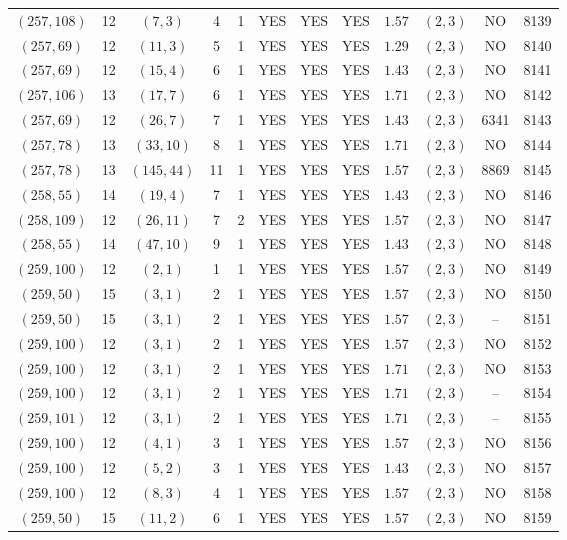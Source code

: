 \begin{longtable}{|c|c|c|c|c|c|c|c|c|c|c|c|}
$(257,108)$ & 12 & $(7,3)$ & 4 & 1 & YES & YES & YES & $1.57$ & $(2,3)$ & NO & 8139\\
$(257,69)$ & 12 & $(11,3)$ & 5 & 1 & YES & YES & YES & $1.29$ & $(2,3)$ & NO & 8140\\
$(257,69)$ & 12 & $(15,4)$ & 6 & 1 & YES & YES & YES & $1.43$ & $(2,3)$ & NO & 8141\\
$(257,106)$ & 13 & $(17,7)$ & 6 & 1 & YES & YES & YES & $1.71$ & $(2,3)$ & NO & 8142\\
$(257,69)$ & 12 & $(26,7)$ & 7 & 1 & YES & YES & YES & $1.43$ & $(2,3)$ & 6341 & 8143\\
$(257,78)$ & 13 & $(33,10)$ & 8 & 1 & YES & YES & YES & $1.71$ & $(2,3)$ & NO & 8144\\
$(257,78)$ & 13 & $(145,44)$ & 11 & 1 & YES & YES & YES & $1.57$ & $(2,3)$ & 8869 & 8145\\
$(258,55)$ & 14 & $(19,4)$ & 7 & 1 & YES & YES & YES & $1.43$ & $(2,3)$ & NO & 8146\\
$(258,109)$ & 12 & $(26,11)$ & 7 & 2 & YES & YES & YES & $1.57$ & $(2,3)$ & NO & 8147\\
$(258,55)$ & 14 & $(47,10)$ & 9 & 1 & YES & YES & YES & $1.43$ & $(2,3)$ & NO & 8148\\
$(259,100)$ & 12 & $(2,1)$ & 1 & 1 & YES & YES & YES & $1.57$ & $(2,3)$ & NO & 8149\\
$(259,50)$ & 15 & $(3,1)$ & 2 & 1 & YES & YES & YES & $1.57$ & $(2,3)$ & NO & 8150\\
$(259,50)$ & 15 & $(3,1)$ & 2 & 1 & YES & YES & YES & $1.57$ & $(2,3)$ & -- & 8151\\
$(259,100)$ & 12 & $(3,1)$ & 2 & 1 & YES & YES & YES & $1.57$ & $(2,3)$ & NO & 8152\\
$(259,100)$ & 12 & $(3,1)$ & 2 & 1 & YES & YES & YES & $1.71$ & $(2,3)$ & NO & 8153\\
$(259,100)$ & 12 & $(3,1)$ & 2 & 1 & YES & YES & YES & $1.71$ & $(2,3)$ & -- & 8154\\
$(259,101)$ & 12 & $(3,1)$ & 2 & 1 & YES & YES & YES & $1.71$ & $(2,3)$ & -- & 8155\\
$(259,100)$ & 12 & $(4,1)$ & 3 & 1 & YES & YES & YES & $1.57$ & $(2,3)$ & NO & 8156\\
$(259,100)$ & 12 & $(5,2)$ & 3 & 1 & YES & YES & YES & $1.43$ & $(2,3)$ & NO & 8157\\
$(259,100)$ & 12 & $(8,3)$ & 4 & 1 & YES & YES & YES & $1.57$ & $(2,3)$ & NO & 8158\\
$(259,50)$ & 15 & $(11,2)$ & 6 & 1 & YES & YES & YES & $1.57$ & $(2,3)$ & NO & 8159\\

\end{longtable}
